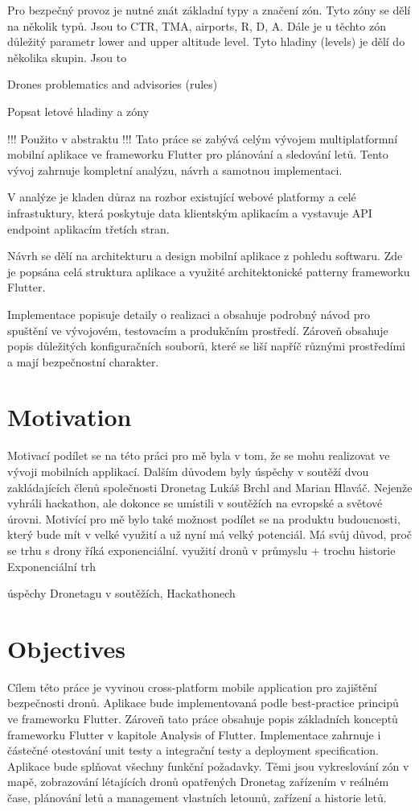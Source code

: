 Pro bezpečný provoz je nutné znát základní typy a značení zón.
Tyto zóny se dělí na několik typů.
Jsou to CTR, TMA, airports, R, D, A.
Dále je u těchto zón důležitý parametr lower and upper altitude level.
Tyto hladiny (levels) je dělí do několika skupin.
Jsou to


Drones problematics and advisories (rules)

Popsat letové hladiny a zóny


!!! Použito v abstraktu !!!
Tato práce se zabývá celým vývojem multiplatformní mobilní aplikace ve frameworku Flutter pro plánování a sledování letů.
Tento vývoj zahrnuje kompletní analýzu, návrh a samotnou implementaci.

V analýze je kladen důraz na rozbor existující webové platformy a celé infrastuktury, která poskytuje data klientským aplikacím a vystavuje API endpoint aplikacím třetích stran.

Návrh se dělí na architekturu a design mobilní aplikace z pohledu softwaru.
Zde je popsána celá struktura aplikace a využité architektonické patterny frameworku Flutter.

Implementace popisuje detaily o realizaci a obsahuje podrobný návod pro spuštění ve vývojovém, testovacím a produkčním prostředí.
Zároveň obsahuje popis důležitých konfiguračních souborů, které se liší napříč různými prostředími a mají bezpečnostní charakter.

\section{Motivation}\label{sec:motivation}
Motivací podílet se na této práci pro mě byla v tom, že se mohu realizovat ve vývoji mobilních applikací.
Dalším důvodem byly úspěchy v soutěží dvou zakládajících členů společnosti Dronetag Luk{\' a}{\v s} Brchl and Marian Hlav{\' a}{\v c}.
Nejenže vyhráli hackathon, ale dokonce se umístili v soutěžích na evropské a světové úrovni.
Motivící pro mě bylo také možnost podílet se na produktu budoucnosti, který bude mít v velké využití a už nyní má velký potenciál.
Má svůj důvod, proč se trhu s drony říká exponenciální.
využití dronů v průmyslu + trochu historie
Exponenciální trh

úspěchy Dronetagu v soutěžích, Hackathonech


\section{Objectives}\label{sec:objectives}
Cílem této práce je vyvinou cross-platform mobile application pro zajištění bezpečnosti dronů.
Aplikace bude implementovaná podle best-practice principů ve frameworku Flutter.
Zároveň tato práce obsahuje popis základních konceptů frameworku Flutter v kapitole Analysis of Flutter.
Implementace zahrnuje i částečné otestování unit testy a integrační testy a deployment specification.
Aplikace bude splňovat všechny funkční požadavky.
Těmi jsou vykreslování zón v mapě, zobrazování létajících dronů opatřených Dronetag zařízením v reálném čase, plánování letů a management vlastních letounů, zařízení a historie letů.


